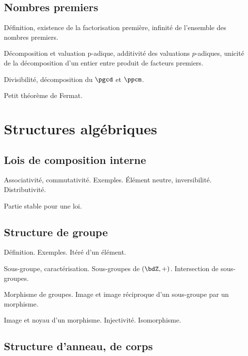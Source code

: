 \documentclass[a4paper,french,bookmarks]{article}
\begin{document}
\subsection{Nombres premiers}

\begin{enumerate}
    \ithand Définition, existence de la factorisation première, infinité de l’ensemble des nombres premiers.
    
    \ithand Décomposition et valuation p-adique, additivité des valuations $p$-adiques, unicité de la décomposition d’un entier entre produit de facteurs premiers.
    
    \ithand Divisibilité, décomposition du $\pgcd$ et $\ppcm$.
    
    \ithand Petit théorème de Fermat.
\end{enumerate}

\section*{Structures algébriques}

\subsection{Lois de composition interne}

\begin{enumerate}
    \ithand Associativité, commutativité. Exemples. Élément neutre, inversibilité. Distributivité.
    
    \ithand Partie stable pour une loi.
\end{enumerate}

\subsection{Structure de groupe}

\begin{enumerate}
    \ithand Définition. Exemples. Itéré d’un élément.

    \ithand Sous-groupe, caractérisation. Sous-groupes de $(\bdZ,+)$. Intersection de sous-groupes.

    \ithand Morphisme de groupes. Image et image réciproque d’un sous-groupe par un morphisme.

    \ithand Image et noyau d’un morphisme. Injectivité. Isomorphisme.
\end{enumerate}

\subsection{Structure d’anneau, de corps}
\end{document}
